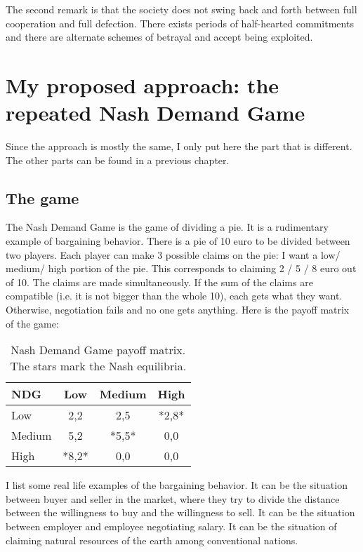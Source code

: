 \documentclass[12.5pt]{report}
\begin{document}
The second remark is that the society does not swing back and forth between full cooperation and full defection. There exists periods of half-hearted commitments and there are alternate schemes of betrayal and accept being exploited.


\chapter{My proposed approach: the repeated Nash Demand Game}

Since the approach is mostly the same, I only put here the part that is different. The other parts can be found in a previous chapter.

\section{The game}

The Nash Demand Game is the game of dividing a pie. It is a rudimentary example of bargaining behavior. There is a pie of 10 euro to be divided between two players. Each player can make 3 possible claims on the pie: I want a low/ medium/ high portion of the pie. This corresponds to claiming 2 / 5 / 8 euro out of 10. The claims are made simultaneously. If the sum of the claims are compatible (i.e. it is not bigger than the whole 10), each gets what they want. Otherwise, negotiation fails and no one gets anything. Here is the payoff matrix of the game:

\begin{table}[h!]
\center
\begin{tabular}{l|ccc}
\textbf{NDG}&Low& Medium&High\\
\hline
Low & 2,2 & 2,5& *2,8*\\
Medium & 5,2 & *5,5* &0,0\\
High & *8,2*&0,0&0,0\\
\end{tabular}
\caption{Nash Demand Game payoff matrix. The stars mark the Nash equilibria.}
\end{table}

I list some real life examples of the bargaining behavior. It can be the situation between buyer and seller in the market, where they try to divide the distance between the willingness to buy and the willingness to sell. It can be the situation between employer and employee negotiating salary. It can be the situation of claiming natural resources of the earth among conventional nations.\\
\end{document}
